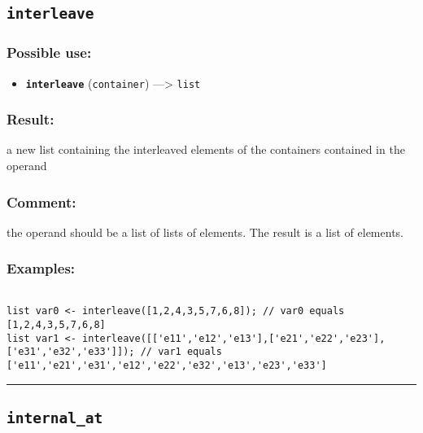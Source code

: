 \documentclass[]{book}
\providecommand{\tightlist}{%
  \setlength{\itemsep}{0pt}\setlength{\parskip}{0pt}}
\theoremstyle{definition}
\theoremstyle{definition}
\theoremstyle{definition}
\theoremstyle{remark}
\begin{document}
\subsection{\texorpdfstring{\texttt{interleave}}{interleave}}\label{interleave}

\subsubsection{Possible use:}\label{possible-use-278}

\begin{itemize}
\tightlist
\item
  \textbf{\texttt{interleave}} (\texttt{container}) ---\textgreater{}
  \texttt{list}
\end{itemize}

\subsubsection{Result:}\label{result-268}

a new list containing the interleaved elements of the containers
contained in the operand

\subsubsection{Comment:}\label{comment-54}

the operand should be a list of lists of elements. The result is a list
of elements.

\subsubsection{Examples:}\label{examples-211}

\begin{verbatim}
 
list var0 <- interleave([1,2,4,3,5,7,6,8]); // var0 equals [1,2,4,3,5,7,6,8] 
list var1 <- interleave([['e11','e12','e13'],['e21','e22','e23'],['e31','e32','e33']]); // var1 equals ['e11','e21','e31','e12','e22','e32','e13','e23','e33']
\end{verbatim}

\begin{center}\rule{0.5\linewidth}{\linethickness}\end{center}

\subsection{\texorpdfstring{\texttt{internal\_at}}{internal\_at}}\label{internal_at}
\end{document}
